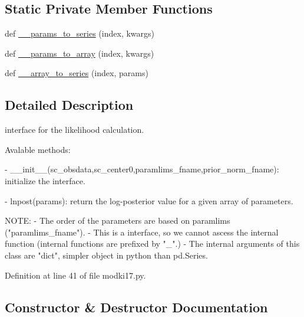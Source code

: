 \subsection*{Static Private Member Functions}
\begin{DoxyCompactItemize}
\item 
def \hyperlink{classmodki17_1_1modKI17_a653d564d2d311c30ed95eacb6503432b}{\+\_\+\+\_\+params\+\_\+to\+\_\+series} (index, kwargs)
\item 
def \hyperlink{classmodki17_1_1modKI17_a0ec91778c40f8911c85e1af7459516d8}{\+\_\+\+\_\+params\+\_\+to\+\_\+array} (index, kwargs)
\item 
def \hyperlink{classmodki17_1_1modKI17_a2696f15483913b4d08f5e8a9efb47330}{\+\_\+\+\_\+array\+\_\+to\+\_\+series} (index, params)
\end{DoxyCompactItemize}


\subsection{Detailed Description}
\begin{DoxyVerb}interface for the likelihood calculation.


Avalable methods:

    - __init__(sc_obsdata,sc_center0,paramlims_fname,prior_norm_fname):
        initialize the interface.
        
    - lnpost(params):
        return the log-posterior value for a given array of parameters.


NOTE:
    - The order of the parameters are based on paramlims ("paramlims_fname").
    - This is a interface, so we cannot ascess the internal function
      (internal functions are prefixed by "_".)
    - The internal arguments of this class are "dict",
      simpler object in python than pd.Series.
\end{DoxyVerb}
 

Definition at line 41 of file modki17.\+py.



\subsection{Constructor \& Destructor Documentation}
\mbox{\label{classmodki17_1_1modKI17_a2514450fa8938c601d942fb15af934d4}} 
